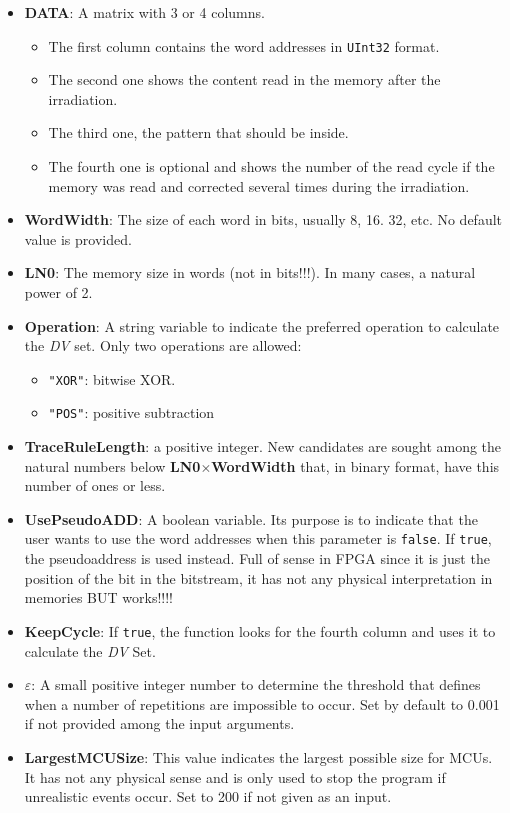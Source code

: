 \begin{itemize}
\begin{itemize}
 		\item   \textbf{DATA}: A matrix with 3 or 4 columns. 
 		\begin{itemize}
 			\item The first column contains the word addresses in \texttt{UInt32} format.
 			\item The second one shows the content read in the memory after the irradiation.
 			\item The third one, the pattern that should be inside.
 			\item  The fourth one is optional and shows the number of the read cycle if the   memory was read and corrected several times during the irradiation.
 		\end{itemize}
 		\item   \textbf{WordWidth}: The size of each word in bits, usually 8, 16. 32, etc. No default value is provided.
 		\item   \textbf{LN0}: The memory size in words (not in bits!!!). In many cases, a natural power of 2.
 		\item   \textbf{Operation}: A string variable to indicate the preferred operation to calculate
 		the \textit{DV} set. Only two operations are allowed: 
 		\begin{itemize}
 			\item \texttt{"XOR"}: bitwise XOR.
 			\item\texttt{"POS"}: positive subtraction
 		\end{itemize}
 		\item \textbf{TraceRuleLength}: a positive integer. New candidates are sought among the natural numbers below \textbf{LN0}\(\times\)\textbf{WordWidth} that, in binary format, have this number of ones or less.
 		\item  \textbf{UsePseudoADD}: A boolean variable. Its purpose is to indicate that the user wants to use the word addresses when this parameter is \texttt{false}. If \texttt{true}, the pseudoaddress is used instead. Full of sense in FPGA since it is just the position  of the bit in the bitstream, it has not any physical interpretation in memories BUT works!!!!
 		\item   \textbf{KeepCycle}: If \texttt{true}, the function looks for the fourth column and uses it to calculate the \textit{DV} Set.
 		\item   \textbf{\(\varepsilon\)}: A small positive integer number to determine the threshold that defines when a number of repetitions are impossible to occur. Set by default to 0.001 if not provided among the input arguments.
 		\item  \textbf{LargestMCUSize}: This value indicates the largest possible size for MCUs. It has not any physical sense  and is only used to stop the program if unrealistic events occur. Set to 200 if not given as an input.
 		

\end{itemize}
\end{itemize}
